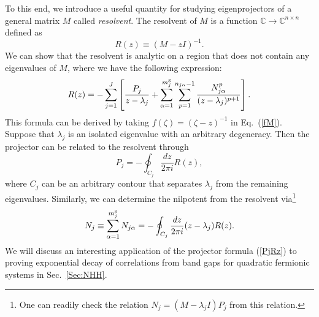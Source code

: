 \documentclass{tADP2e}
\theoremstyle{plain}
\theoremstyle{plain}
\theoremstyle{definition}
\begin{document}
To this end, we introduce a useful quantity for studying %
eigenprojectors of a general matrix $M$ called \emph{resolvent}. The resolvent of $M$ is a function $\mathbb{C}\to\mathbb{C}^{n\times n}$ defined as \cite{TK80}
\begin{equation}
R(z)\equiv(M-zI)^{-1}.
\end{equation} 
We can show that the resolvent is analytic on a region that does not contain any eigenvalues of $M$, where we have the following expression: 
\begin{equation}
R(z)=-\sum^J_{j=1}\left[\frac{P_j}{z-\lambda_j}+\sum^{m^{\rm g}_j}_{\alpha=1}\sum^{n_{j\alpha}-1}_{p=1}\frac{N^p_{j\alpha}}{(z-\lambda_j)^{p+1}}\right].
\end{equation}
This formula can be derived by taking $f(\zeta)=(\zeta-z)^{-1}$ in Eq.~(\ref{fM}). Suppose that $\lambda_j$ is an isolated eigenvalue with an arbitrary degeneracy. %
Then the projector can be related to the resolvent through 
\begin{equation}
P_j=-\oint_{C_j}\frac{dz}{2\pi i}R(z),
\label{PjRz}
\end{equation}
where $C_j$ can be an arbitrary contour that separates $\lambda_j$ from the remaining eigenvalues. Similarly, we can determine the nilpotent from the resolvent via\footnote{One can readily  check the relation $N_j=(M-\lambda_j I) P_j$ from this relation.}
\begin{equation}
N_j\equiv\sum^{m^{\rm g}_j}_{\alpha=1}N_{j\alpha}=-\oint_{C_j}\frac{dz}{2\pi i}(z-\lambda_j)R(z).
\label{NjRz}
\end{equation}
We will discuss an interesting application of the projector formula (\ref{PjRz}) to proving exponential decay of correlations from band gaps for quadratic fermionic systems in Sec.~\ref{Sec:NHH}.
\end{document}
